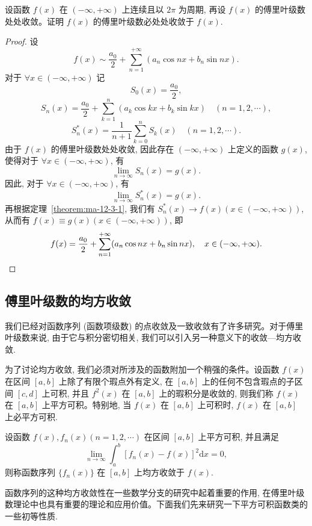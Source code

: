 \begin{example}\label{example:ma-12-3-1}
设函数 $f(x)$ 在 $(-\infty,+\infty)$ 上连续且以 $2\pi$ 为周期, 再设 $f(x)$ 的傅里叶级数处处收敛。证明 $f(x)$ 的傅里叶级数必处处收敛于 $f(x)$.
\end{example}


\begin{proof}
设
\[
  f(x)\sim\frac{a_0}{2}+\sum_{n=1}^{+\infty}(a_n\cos nx+b_n\sin nx).
\]
对于 $\forall x\in(-\infty,+\infty)$ 记
\[
  S_0(x)=\frac{a_0}{2},
\]
\[
  S_n(x)=\frac{a_0}{2}+\sum_{k=1}^n(a_k\cos kx+b_k\sin kx)\quad(n=1,2,\cdots),
\]
\[
  S_n^*(x)=\frac1{n+1}\sum_{k=0}^nS_k(x)\quad(n=1,2,\cdots).
\]
由于 $f(x)$ 的傅里叶级数处处收敛, 因此存在 $(-\infty,+\infty)$ 上定义的函数 $g(x)$, 使得对于 $\forall x\in(-\infty,+\infty)$, 有
\[
  \lim_{n\to\infty}S_n(x)=g(x).
\]
因此, 对于 $\forall x\in(-\infty,+\infty)$, 有
\[
  \lim_{n\to\infty}S_n^*(x)=g(x).
\]
再根据定理~\ref{theorem:ma-12-3-1}, 我们有 $S_n^*(x)\to f(x)(x\in(-\infty,+\infty))$, 从而有 $f(x)\equiv g(x)(x\in(-\infty,+\infty))$, 即
\[
  f(x)=\frac{a_0}{2}+\sum_{n=1}^{+\infty}(a_n\cos nx+b_n\sin nx),\quad x\in(-\infty,+\infty).
\qedhere
\]
\end{proof}


\subsection{傅里叶级数的均方收敛}
\label{subsec:ma-12-3-2}

我们已经对函数序列 (函数项级数) 的点收敛及一致收敛有了许多研究。对于傅里叶级数来说, 由于它与积分密切相关, 我们可以引入另一种意义下的收敛---均方收敛.

为了讨论均方收敛, 我们必须对所涉及的函数附加一个稍强的条件。设函数 $f(x)$ 在区间 $[a,b]$ 上除了有限个瑕点外有定义, 在 $[a,b]$ 上的任何不包含瑕点的子区间 $[c,d]$ 上可积, 并且 $f^2(x)$ 在 $[a,b]$ 上的瑕积分是收敛的, 则我们称 $f(x)$ 在 $[a,b]$ 上平方可积。特别地, 当 $f(x)$ 在 $[a,b]$ 上可积时, $f(x)$ 在 $[a,b]$ 上必平方可积.

\begin{definition}\label{definition:ma-12-3-1}
设函数 $f(x),f_n(x)(n=1,2,\cdots)$ 在区间 $[a,b]$ 上平方可积, 并且满足
\[
  \lim_{n\to\infty}\int_a^b[f_n(x)-f(x)]^2\mathrm dx=0,
\]
则称函数序列 $\{f_n(x)\}$ 在 $[a,b]$ 上均方收敛于 $f(x)$.
\end{definition}

函数序列的这种均方收敛性在一些数学分支的研究中起着重要的作用, 在傅里叶级数理论中也具有重要的理论和应用价值。下面我们先来研究一下平方可积函数类的一些初等性质.

